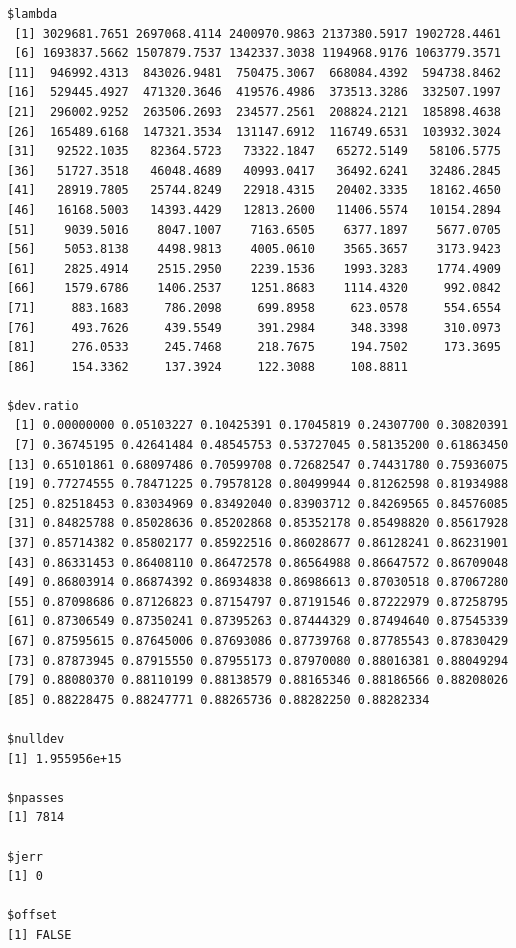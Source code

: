 \documentclass[
]{article}
\begin{document}
\begin{verbatim}
$lambda
 [1] 3029681.7651 2697068.4114 2400970.9863 2137380.5917 1902728.4461
 [6] 1693837.5662 1507879.7537 1342337.3038 1194968.9176 1063779.3571
[11]  946992.4313  843026.9481  750475.3067  668084.4392  594738.8462
[16]  529445.4927  471320.3646  419576.4986  373513.3286  332507.1997
[21]  296002.9252  263506.2693  234577.2561  208824.2121  185898.4638
[26]  165489.6168  147321.3534  131147.6912  116749.6531  103932.3024
[31]   92522.1035   82364.5723   73322.1847   65272.5149   58106.5775
[36]   51727.3518   46048.4689   40993.0417   36492.6241   32486.2845
[41]   28919.7805   25744.8249   22918.4315   20402.3335   18162.4650
[46]   16168.5003   14393.4429   12813.2600   11406.5574   10154.2894
[51]    9039.5016    8047.1007    7163.6505    6377.1897    5677.0705
[56]    5053.8138    4498.9813    4005.0610    3565.3657    3173.9423
[61]    2825.4914    2515.2950    2239.1536    1993.3283    1774.4909
[66]    1579.6786    1406.2537    1251.8683    1114.4320     992.0842
[71]     883.1683     786.2098     699.8958     623.0578     554.6554
[76]     493.7626     439.5549     391.2984     348.3398     310.0973
[81]     276.0533     245.7468     218.7675     194.7502     173.3695
[86]     154.3362     137.3924     122.3088     108.8811

$dev.ratio
 [1] 0.00000000 0.05103227 0.10425391 0.17045819 0.24307700 0.30820391
 [7] 0.36745195 0.42641484 0.48545753 0.53727045 0.58135200 0.61863450
[13] 0.65101861 0.68097486 0.70599708 0.72682547 0.74431780 0.75936075
[19] 0.77274555 0.78471225 0.79578128 0.80499944 0.81262598 0.81934988
[25] 0.82518453 0.83034969 0.83492040 0.83903712 0.84269565 0.84576085
[31] 0.84825788 0.85028636 0.85202868 0.85352178 0.85498820 0.85617928
[37] 0.85714382 0.85802177 0.85922516 0.86028677 0.86128241 0.86231901
[43] 0.86331453 0.86408110 0.86472578 0.86564988 0.86647572 0.86709048
[49] 0.86803914 0.86874392 0.86934838 0.86986613 0.87030518 0.87067280
[55] 0.87098686 0.87126823 0.87154797 0.87191546 0.87222979 0.87258795
[61] 0.87306549 0.87350241 0.87395263 0.87444329 0.87494640 0.87545339
[67] 0.87595615 0.87645006 0.87693086 0.87739768 0.87785543 0.87830429
[73] 0.87873945 0.87915550 0.87955173 0.87970080 0.88016381 0.88049294
[79] 0.88080370 0.88110199 0.88138579 0.88165346 0.88186566 0.88208026
[85] 0.88228475 0.88247771 0.88265736 0.88282250 0.88282334

$nulldev
[1] 1.955956e+15

$npasses
[1] 7814

$jerr
[1] 0

$offset
[1] FALSE


\end{verbatim}
\end{document}
